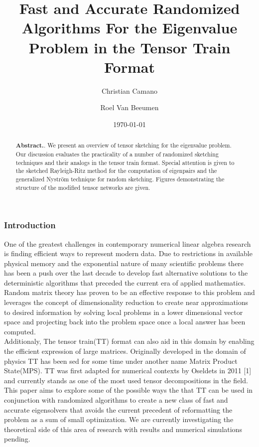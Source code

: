 \documentclass[%
 aip,12pt
 amsmath,amssymb,
 reprint,%
]{revtex4-1}
\begin{document}

\title[Fast and Accurate Randomized Algorithms For the Eigenvalue Problem in the Tensor Train Format]{Fast and Accurate Randomized Algorithms For the Eigenvalue Problem in the Tensor Train Format
}
\author{Christian Camano}
\author{Roel Van Beeumen}%
\date{\today}%

\begin{abstract}
\textbf{Abstract.}.
We present an overview of tensor sketching for the eigenvalue problem. Our discussion evaluates the practicality of a number of randomized sketching techniques and their analogs in the tensor train format. Special attention is given to the sketched Rayleigh-Ritz method for the computation of eigenpairs and the generalized Nyström technique for random sketching. Figures demonstrating the structure of the modified tensor networks are given.
\end{abstract}

\maketitle

\subsubsection{\label{sec:level3}Introduction}
One of the greatest challenges in contemporary numerical linear algebra research is finding efficient ways to represent modern data. Due to restrictions in available physical memory and the exponential nature of many scientific problems there has been a push over the last decade to develop fast alternative solutions to the deterministic algorithms that preceded the current era of applied mathematics. Random matrix theory has proven to be an effective response to this problem and leverages the concept of dimensionality reduction to create near approximations to desired information by solving local problems in a lower dimensional vector space and projecting back into the problem space once a local answer has been computed.
\\
Additionaly, The tensor train(TT) format can also aid in this domain by enabling the efficient expression of large matrices. Originally developed in the domain of physics TT has been sed for some time under another name Matrix Product State(MPS). TT was first adapted for numerical contexts by Oseldets in 2011 [1] and currently stands as one of the most used tensor decompositions in the field.
\\
This paper aims to explore some of the possible ways the that TT can be used in conjunction with randomized algorithms to create a new class of fast and accurate eigensolvers that avoids the current precedent of reformatting the problem as a sum of small optimization. We are currently investigating the theoretical side of this area of research with results and numerical simulations pending.
\end{document}
